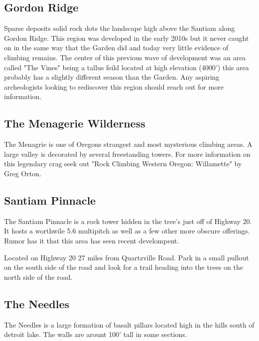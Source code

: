 \begin{multicols}{2}
\subsection*{Gordon Ridge}\label{bf:Gordon Ridge}
Sparse deposits solid rock dots the landscape high above the Santiam along Gordon Ridge. This region was developed in the early 2010s but it never caught on in the same way that the Garden did and today very little evidence of climbing remains. The center of this previous wave of development was an area called "The Vines" being a tallus feild located at high elevation (4000') this area probably has a slightly different season than the Garden. Any aspiring archeologists looking to rediscover this region should reach out for more information.\\
	



\needspace{1.5cm}
\subsection*{The Menagerie Wilderness}\label{bf:The Menagerie Wilderness}
The Menagrie is one of Oregons strangest and most mysterious climbing areas. A large valley is decorated by several freestanding towers. For more information on this legendary crag seek out "Rock Climbing Western Oregon: Willamette" by Greg Orton.\\
	



\needspace{1.5cm}
\subsection*{Santiam Pinnacle}\label{bf:Santiam Pinnacle}
The Santiam Pinnacle is a rock tower hidden in the tree's just off of Highway 20. It hosts a worthwile 5.6 multipitch as well as a few other more obscure offerings. Rumor has it that this area has seen recent develompent.

Located on Highway 20 27 miles from Quartzville Road. Park in a small pullout on the south side of the road and look for a trail heading into the trees on the north side of the road.\\
	



\needspace{1.5cm}
\subsection*{The Needles}\label{bf:The Needles}
The Needles is a large formation of basalt pillars located high in the hills south of detroit lake. The walls are arount 100' tall in some sections.


\end{multicols}
